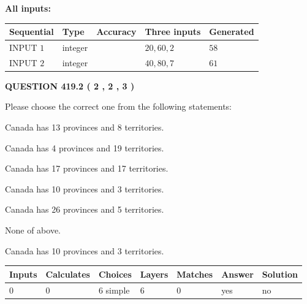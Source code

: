 \documentclass[12pt]{article}
\begin{document}
   
   
   
\noindent\vspace{0.1in}\hspace{-0.08in} {\textbf{\Large{All inputs: }}}
   
   
  
  
\noindent\begin{tabular}{|l|l|l|l|l|}
\hline
 Sequential & Type & Accuracy & Three inputs & Generated \\ 
\hline
 
 
  INPUT $  1 $ & integer &  & $
 20
 , 
 60
 , 
 2
 $ & $ 58 $ 
 \\  \hline  
 
 
  INPUT $  2 $ & integer &  & $
 40
 , 
 80
 , 
 7
 $ & $ 61 $ 
 \\  \hline  
 \end{tabular}
   
   
  
\vspace{0.2in}
  
{\textbf{\Large{QUESTION
419.2 
 ( 2 , 2 , 3 )
}}}
  
  
Please choose the correct one from the following statements:
 
 
Canada has  13 provinces and  8 territories.
 
 
Canada has   4 provinces and  19 territories.
 
 
Canada has  17 provinces and  17 territories.
 
 
Canada has 10  provinces and 3 territories.
 
 
Canada has  26 provinces and  5 territories.
 
 
 None of above.
 
 
\noindent{}
 
 
Canada has 10  provinces and 3 territories.
 
 
\noindent{}
 
 
   
   
   
   
\noindent\begin{tabular}{|l|l|l|l|l|l|l|}
 \hline
Inputs & Calculates & Choices & Layers & Matches & Answer & Solution \\ \hline
 0  & 
 0  & 
 6
  simple  
  & 
 6  & 
 0  & 
  yes & 
  no 
  \\ \hline
 \end{tabular}
   
\end{document}
